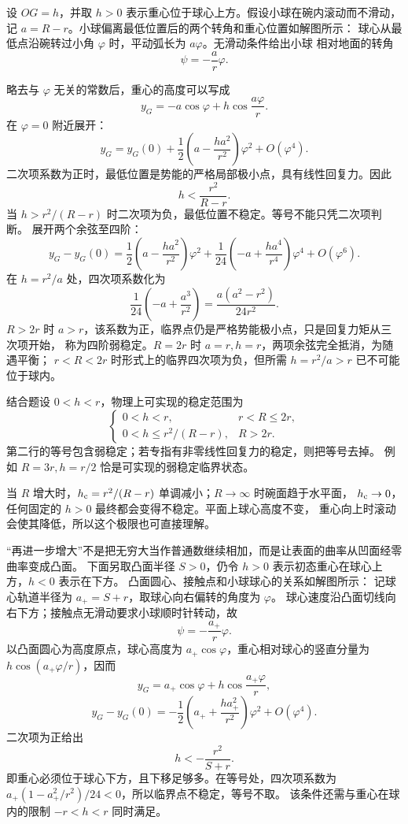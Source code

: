 \begin{xesolution}
设 $OG=h$，并取 $h>0$ 表示重心位于球心上方。假设小球在碗内滚动而不滑动，记
$a=R-r$。小球偏离最低位置后的两个转角和重心位置如解图所示：
\soldiagOneThirtyOne
球心从最低点沿碗转过小角 $\varphi$ 时，平动弧长为 $a\varphi$。无滑动条件给出小球
相对地面的转角
\[
  \psi=-\frac{a}{r}\varphi.
\]

略去与 $\varphi$ 无关的常数后，重心的高度可以写成
\[
  y_G=-a\cos\varphi+h\cos\frac{a\varphi}{r}.
\]
在 $\varphi=0$ 附近展开：
\[
  y_G=y_G(0)+\frac12\left(a-\frac{ha^2}{r^2}\right)\varphi^2
  +O(\varphi^4).
\]
二次项系数为正时，最低位置是势能的严格局部极小点，具有线性回复力。因此
\[
  \boxed{h<\frac{r^2}{R-r}}.
\]
当 $h>r^2/(R-r)$ 时二次项为负，最低位置不稳定。等号不能只凭二次项判断。
展开两个余弦至四阶：
\[
 y_G-y_G(0)=\frac12\left(a-\frac{ha^2}{r^2}\right)\varphi^2
 +\frac1{24}\left(-a+\frac{ha^4}{r^4}\right)\varphi^4+O(\varphi^6).
\]
在 $h=r^2/a$ 处，四次项系数化为
\[
 \frac1{24}\left(-a+\frac{a^3}{r^2}\right)
 =\frac{a(a^2-r^2)}{24r^2}.
\]
$R>2r$ 时 $a>r$，该系数为正，临界点仍是严格势能极小点，只是回复力矩从三次项开始，
称为四阶弱稳定。$R=2r$ 时 $a=r,h=r$，两项余弦完全抵消，为随遇平衡；
$r<R<2r$ 时形式上的临界四次项为负，但所需 $h=r^2/a>r$ 已不可能位于球内。

结合题设 $0<h<r$，物理上可实现的稳定范围为
\[
 \boxed{\begin{cases}
  0<h<r, & r<R\le2r,\\
  0<h\le r^2/(R-r), & R>2r.
 \end{cases}}
\]
第二行的等号包含弱稳定；若专指有非零线性回复力的稳定，则把等号去掉。
例如 $R=3r,h=r/2$ 恰是可实现的弱稳定临界状态。

当 $R$ 增大时，$h_{\rm c}=r^2/(R-r)$ 单调减小；$R\to\infty$ 时碗面趋于水平面，
$h_{\rm c}\to0$，任何固定的 $h>0$ 最终都会变得不稳定。平面上球心高度不变，
重心向上时滚动会使其降低，所以这个极限也可直接理解。

“再进一步增大”不是把无穷大当作普通数继续相加，而是让表面的曲率从凹面经零曲率变成凸面。
下面另取凸面半径 $S>0$，仍令 $h>0$ 表示初态重心在球心上方，$h<0$ 表示在下方。
\Needspace{65mm}
凸面圆心、接触点和小球球心的关系如解图所示：
\soldiagConvexRolling
记球心轨道半径为 $a_+=S+r$，取球心向右偏转的角度为 $\varphi$。
球心速度沿凸面切线向右下方；接触点无滑动要求小球顺时针转动，故
\[
 \psi=-\frac{a_+}{r}\varphi.
\]
以凸面圆心为高度原点，球心高度为 $a_+\cos\varphi$，重心相对球心的竖直分量为
$h\cos(a_+\varphi/r)$，因而
\[
 y_G=a_+\cos\varphi+h\cos\frac{a_+\varphi}{r},
\]
\[
 y_G-y_G(0)=-\frac12\left(a_++\frac{ha_+^2}{r^2}\right)\varphi^2+O(\varphi^4).
\]
二次项为正给出
\[
 \boxed{h<-\frac{r^2}{S+r}}.
\]
即重心必须位于球心下方，且下移足够多。在等号处，四次项系数为
$a_+(1-a_+^2/r^2)/24<0$，所以临界点不稳定，等号不取。
该条件还需与重心在球内的限制 $-r<h<r$ 同时满足。
\end{xesolution}
